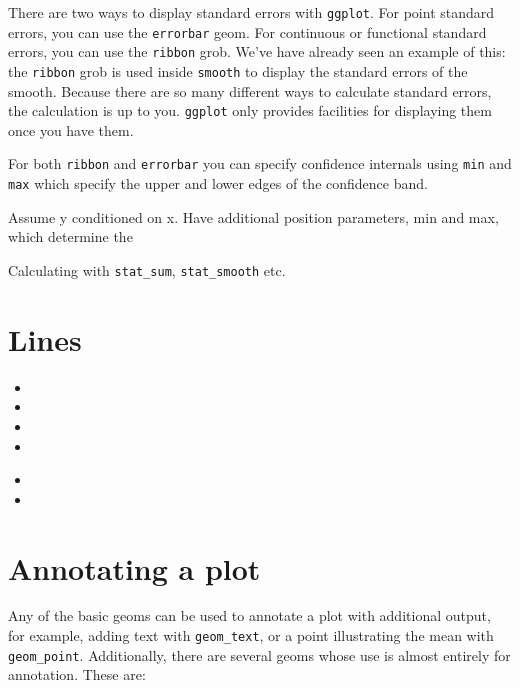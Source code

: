 There are two ways to display standard errors with {\tt ggplot}.  For point standard errors, you can use the {\tt errorbar} geom.  For continuous or functional standard errors, you can use the {\tt ribbon} grob.  We've have already seen an example of this: the {\tt ribbon} grob is used inside {\tt smooth} to display the standard errors of the smooth.  Because there are so many different ways to calculate standard errors, the calculation is up to you.  {\tt ggplot} only provides facilities for displaying them once you have them.

For both {\tt ribbon} and {\tt errorbar} you can specify confidence internals using {\tt min} and {\tt max} which specify the upper and lower edges of the confidence band.

Assume y conditioned on x.  Have additional position parameters, min and max, which determine the 


Calculating with {\tt stat\_sum}, {\tt stat\_smooth} etc.

\section{Lines}
\label{sec:lines}

\begin{itemize}
  \item {}
  \item {}
  \item {}
  \item {}
\end{itemize}

\begin{itemize}
  \item {}
  \item {}
\end{itemize}


\section{Annotating a plot}\label{sub:annotating_a_plot}

Any of the basic geoms can be used to annotate a plot with additional output, for example, adding text with {\tt geom\_text}, or a point illustrating the mean with {\tt geom\_point}.  Additionally, there are several geoms whose use is almost entirely for annotation.  These are:

